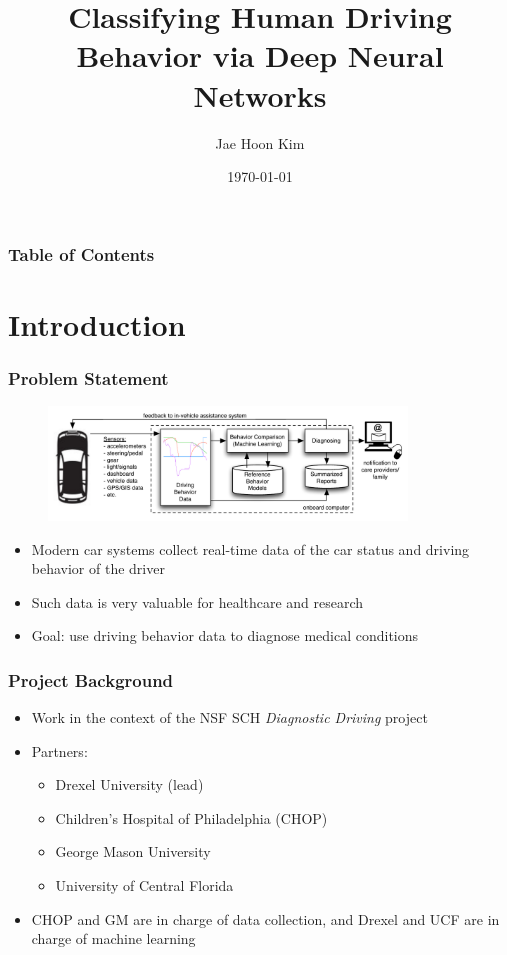 \documentclass{beamer}
\title{Classifying Human Driving Behavior via Deep Neural Networks}
\author{Jae Hoon Kim}
\institute{Drexel University}
\date{\today}
\begin{document}
\frame{\titlepage}


\begin{frame}
\frametitle{Table of Contents}
\tableofcontents
\end{frame}

\section{Introduction}
\begin{frame}
\frametitle{Problem Statement}
\begin{figure}[t!]
    \centering
    \includegraphics[width=0.85\textwidth]{project-overall}
    \label{fig:diagnosticdriving}
\end{figure}
\begin{itemize}
\item Modern car systems collect real-time data of the car status and driving behavior of the driver
\item Such data is very valuable for healthcare and research
\item {\color{blue} Goal}: use driving behavior data to diagnose medical conditions
\end{itemize}
\end{frame}

\begin{frame}
\frametitle{Project Background}
\begin{itemize}
\item Work in the context of the NSF SCH {\em Diagnostic Driving} project
\item Partners:
	\begin{itemize}
	\item Drexel University (lead)
	\item Children's Hospital of Philadelphia (CHOP)
	\item George Mason University
	\item University of Central Florida
	\end{itemize}
\item CHOP and GM are in charge of data collection, and Drexel and UCF are in charge of machine learning
\end{itemize}
\end{frame}
\end{document}
